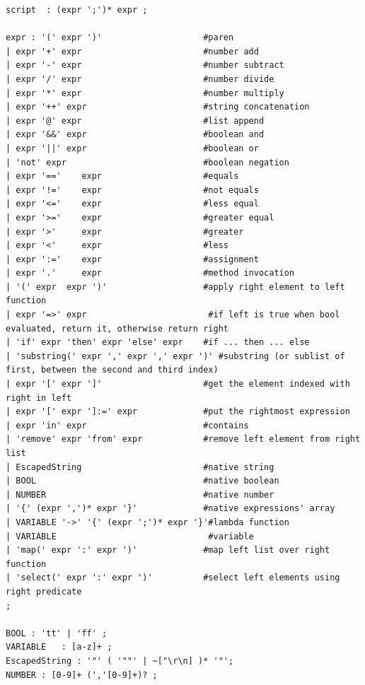 \begin{lstfloat}[!p]
\begin{lstlisting}[language=antlr,caption=Subset of the \texttt{script} language in Antlr4.,label=def:script]
script  : (expr ';')* expr ;

expr : '(' expr ')'                    #paren
| expr '+' expr                        #number add
| expr '-' expr                        #number subtract
| expr '/' expr                        #number divide
| expr '*' expr                        #number multiply
| expr '++' expr                       #string concatenation
| expr '@' expr                        #list append
| expr '&&' expr                       #boolean and
| expr '||' expr                       #boolean or
| 'not' expr                           #boolean negation
| expr '=='    expr                    #equals
| expr '!='    expr                    #not equals
| expr '<='    expr                    #less equal
| expr '>='    expr                    #greater equal
| expr '>'     expr                    #greater
| expr '<'     expr                    #less
| expr ':='    expr                    #assignment
| expr '.'     expr                    #method invocation
| '(' expr  expr ')'                   #apply right element to left function
| expr '=>' expr                        #if left is true when bool evaluated, return it, otherwise return right
| 'if' expr 'then' expr 'else' expr    #if ... then ... else
| 'substring(' expr ',' expr ',' expr ')' #substring (or sublist of first, between the second and third index)
| expr '[' expr ']'                    #get the element indexed with right in left
| expr '[' expr ']:=' expr             #put the rightmost expression
| expr 'in' expr                       #contains
| 'remove' expr 'from' expr            #remove left element from right list
| EscapedString                        #native string
| BOOL                                 #native boolean
| NUMBER                               #native number
| '{' (expr ',')* expr '}'             #native expressions' array
| VARIABLE '->' '{' (expr ';')* expr '}'#lambda function
| VARIABLE                              #variable
| 'map(' expr ':' expr ')'             #map left list over right function
| 'select(' expr ':' expr ')'          #select left elements using right predicate
;

BOOL : 'tt' | 'ff' ;
VARIABLE   : [a-z]+ ;
EscapedString : '"' ( '""' | ~["\r\n] )* '"';
NUMBER : [0-9]+ (','[0-9]+)? ;
\end{lstlisting}
\end{lstfloat}

